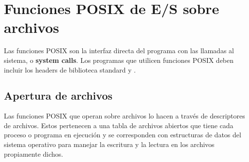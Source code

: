 % 

\section{Funciones POSIX de E/S sobre archivos}
\label{subsec:esarchivosposix}

Las funciones POSIX son la interfaz directa del programa con las llamadas al
sistema, o \textbf{system calls}. Los programas que utilicen funciones POSIX deben incluir los headers de
biblioteca standard  y .
 

\subsection{Apertura de archivos}
Las funciones POSIX que operan sobre archivos lo hacen
a través de descriptores de archivos. Estos pertenecen a una tabla de archivos
abiertos que tiene cada proceso o programa en ejecución y se corresponden con
estructuras de datos del sistema operativo para manejar la escritura y la
lectura en los archivos propiamente dichos.

